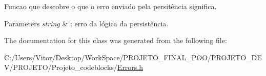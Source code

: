 Funcao que descobre o que o erro enviado pela persitência significa. 


\begin{DoxyParams}{Parameters}
{\em string} & \-: erro da lógica da persistência. \\
\hline
\end{DoxyParams}


The documentation for this class was generated from the following file\-:\begin{DoxyCompactItemize}
\item 
C\-:/\-Users/\-Vitor/\-Desktop/\-Work\-Space/\-P\-R\-O\-J\-E\-T\-O\-\_\-\-F\-I\-N\-A\-L\-\_\-\-P\-O\-O/\-P\-R\-O\-J\-E\-T\-O\-\_\-\-D\-E\-V/\-P\-R\-O\-J\-E\-T\-O/\-Projeto\-\_\-codeblocks/\hyperlink{_errors_8h}{Errors.\-h}\end{DoxyCompactItemize}
